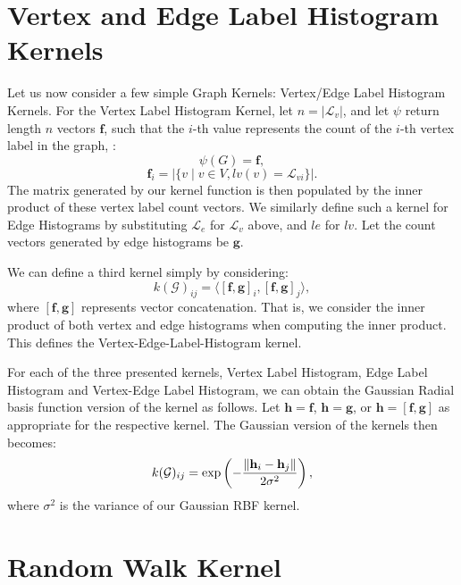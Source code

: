 \section{Vertex and Edge Label Histogram Kernels}
\label{appendix:graph_kernels:histogram}

Let us now consider a few simple Graph Kernels: Vertex/Edge Label Histogram
Kernels. For the Vertex Label Histogram Kernel, let $n=|\mathcal{L}_v|$, and let
$\psi$ return length $n$ vectors $\mathbf{f}$, such that the $i$-th value
represents the count of the $i$-th vertex label in the graph, \ie: 
\begin{equation}
    \psi(G) = \mathbf{f},
\end{equation}
\begin{equation}
    \mathbf{f}_i=|\{v \mid v \in V, lv(v) = \mathcal{L}_{vi}\}|.
\end{equation}
%
The matrix generated by our kernel function is then populated by the inner
product of these vertex label count vectors.
We similarly define such a kernel for Edge Histograms by substituting
$\mathcal{L}_e$ for $\mathcal{L}_v$ above, and $le$ for $lv$. Let the count
vectors generated by edge histograms be $\mathbf{g}$.

We can define a third kernel simply by considering:
\begin{equation}
    k(\mathcal{G})_{ij} = \langle[\mathbf{f},\mathbf{g}]_i, [\mathbf{f},\mathbf{g}]_j\rangle,
\end{equation}
%
where $[\mathbf{f},\mathbf{g}]$ represents vector concatenation. That is, we
consider the inner product of both vertex and edge histograms when computing the
inner product. This defines the Vertex-Edge-Label-Histogram kernel.

For each of the three presented kernels, Vertex Label Histogram, Edge Label
Histogram and Vertex-Edge Label Histogram, we can obtain the Gaussian Radial
basis function version of the kernel as follows. Let $\mathbf{h} = \mathbf{f}$,
$\mathbf{h} = \mathbf{g}$, or $\mathbf{h} = \mathbf{[\mathbf{f}, \mathbf{g}]}$
as appropriate for the respective kernel. The Gaussian version of the kernels
then becomes:
\begin{equation}
    k(\mathcal{G})_{ij} = \text{exp}\left(-\frac{\lVert\mathbf{h}_i - \mathbf{h}_j\rVert}{2\sigma^2}\right),
\end{equation}
%
where $\sigma^2$ is the variance of our Gaussian RBF kernel.


\section{Random Walk Kernel}
\label{appendix:graph_kernels:random_walk}

